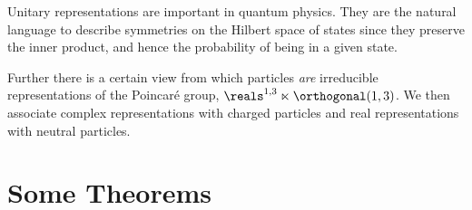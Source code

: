 \documentclass[fleqn]{NotesClass}
\begin{document}
    \begin{app}{}{}
        Unitary representations are important in quantum physics.
        They are the natural language to describe symmetries on the Hilbert space of states since they preserve the inner product, and hence the probability of being in a given state.
        
        Further there is a certain view from which particles \emph{are} irreducible representations of the Poincar\'e group, \(\reals^{1, 3} \ltimes \orthogonal(1, 3)\).
        We then associate complex representations with charged particles and real representations with neutral particles.
    \end{app}
    
    \section{Some Theorems}
\end{document}
